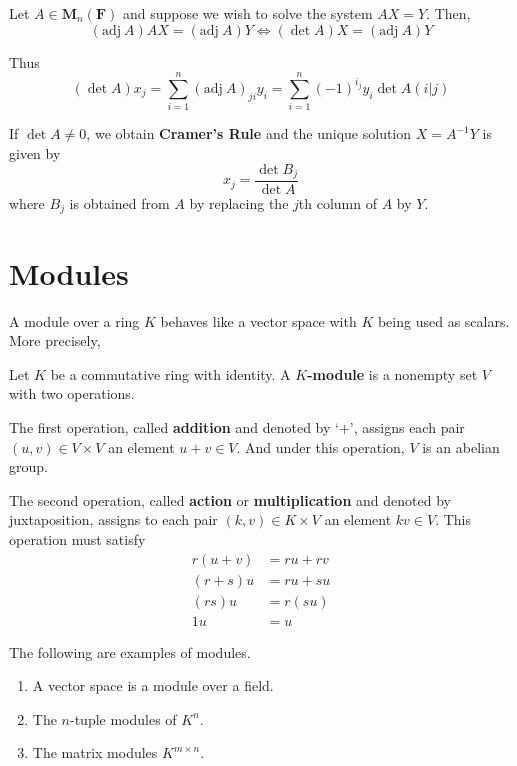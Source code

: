 \begin{example}
	Let $A \in \textbf{M}_n(\textbf{F})$ and suppose we wish to solve the system $AX = Y$. Then,
	\[
		(\text{adj}~A)AX = (\text{adj}~A)Y \iff (\det A)X = (\text{adj}~A)Y
	\]
	
	Thus
	\[
		(\det A)x_j = \sum_{i=1}^n (\text{adj}~A)_{ji} y_i = \sum_{i=1}^n (-1)^{i_j} y_i \det A(i|j)
	\]
	
	If $\det A \neq 0$, we obtain \textbf{Cramer's Rule} and the unique solution $X = A^{-1}Y$ is given by
	\[
		x_j = \frac{\det B_j}{\det A}
	\]
	where $B_j$ is obtained from $A$ by replacing the $j$th column of $A$ by $Y$.
\end{example}

\section{Modules}

A module over a ring $K$ behaves like a vector space with $K$ being used as scalars. More precisely,

\begin{definition}[Module]
	Let $K$ be a commutative ring with identity. A \textbf{$K$-module} is a nonempty set $V$ with two operations.

	The first operation, called \textbf{addition} and denoted by `+', assigns each pair $(u, v) \in V \times V$ an element $u+v \in V$. And under this operation, $V$ is an abelian group.

	The second operation, called \textbf{action} or \textbf{multiplication} and denoted by juxtaposition, assigns to each pair $(k, v) \in K \times V$ an element $kv \in V$. This operation must satisfy 
	\begin{equation*}
		\begin{aligned}
			r(u+v) &= ru + rv \\
			(r+s)u &= ru + su \\
			(rs)u &= r(su) \\
			1u &= u
		\end{aligned}
	\end{equation*}
\end{definition}

\begin{example}
	The following are examples of modules.
	\begin{enumerate}
		\item A vector space is a module over a field.
		\item The $n$-tuple modules of $K^n$.
		\item The matrix modules $K^{m \times n}$.
	\end{enumerate}
\end{example}

